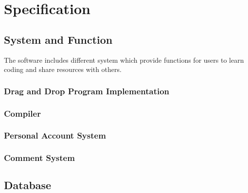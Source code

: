 \chapter{Specification}
\section{System and Function}
The software includes different system which provide functions for users to learn coding and share resources with others.
\subsection{Drag and Drop Program Implementation}
	
\subsection{Compiler}
\subsection{Personal Account System}
	
\subsection{Comment System}
\section{Database}
